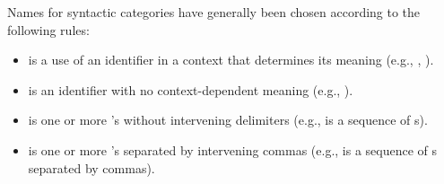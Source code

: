\pnum
Names for syntactic categories have generally been chosen according to
the following rules:
\begin{itemize}
\item {} is a use of an identifier in a context that
determines its meaning (e.g., ,
).
\item {} is an identifier with no context-dependent meaning
(e.g., ).
\item {} is one or more 's without intervening
delimiters (e.g.,  is a sequence of
s).
\item {} is one or more 's separated by
intervening commas (e.g.,  is a sequence of
s separated by commas).
\end{itemize}%
